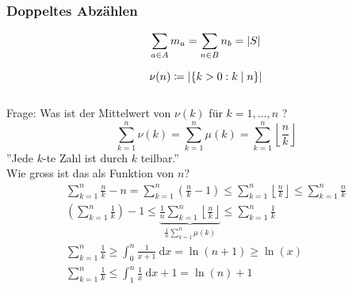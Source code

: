 \subsubsection{Doppeltes Abzählen}
\[ \sum_{a \in A} m_a = \sum_{n \in B} n_b = \abs{S} \]
\begin{bsp*}
	\[\nu(n) \coloneqq \abs{\{ k> 0 : k \mid n \}} \]\\
	Frage: Was ist der Mittelwert von $\nu(k)$ für $k=1, \dotsc , n$ ? \\
	\[ \sum_{k=1}^n \nu(k) = \sum_{k=1}^n \mu(k) = \sum_{k=1}^n \left\lfloor \frac{n}{k} \right\rfloor \]
	''Jede $k$-te Zahl ist durch $k$ teilbar.'' \\
	Wie gross ist das als Funktion von $n$? \\
	\begin{gather*}
		\sum_{k=1}^n \frac{n}{k} - n = \sum_{k=1}^n (\frac{n}{k} - 1) \leq \sum_{k=1}^n \left\lfloor \frac{n}{k} \right\rfloor \leq \sum_{k=1}^n \frac{n}{k} \\
		\left(\sum_{k=1}^n \frac{1}{k}\right) -1 \leq \underbrace{\frac{1}{n} \sum_{k=1}^n \left\lfloor \frac{n}{k} \right\rfloor}_{\frac{1}{n} \sum_{k=1}^n \mu(k)} \leq \sum_{k=1}^n  \frac{1}{k} \\
		\sum_{k=1}^n  \frac{1}{k} \geq \int_0^n \frac{1}{x+1} \:\mathrm{d}x = \ln(n+1) \geq \ln(x) \\
		\sum_{k=1}^n  \frac{1}{k} \leq \int_1^n \frac{1}{x} \:\mathrm{d}x+1 = \ln(n) +1
	\end{gather*}
\end{bsp*}
